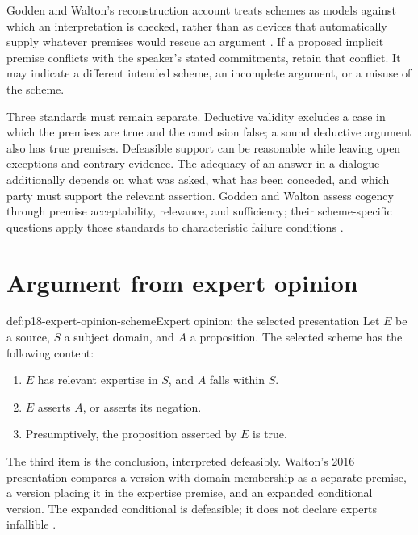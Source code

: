 Godden and Walton's reconstruction account treats schemes as models
against which an interpretation is checked, rather than as devices that
automatically supply whatever premises would rescue an argument
\cite[pp.~271--272]{GoddenWalton2007SchemesQuestions}.
If a proposed implicit premise conflicts with the speaker's stated
commitments, retain that conflict. It may indicate a different intended
scheme, an incomplete argument, or a misuse of the scheme.

Three standards must remain separate. Deductive validity excludes a case
in which the premises are true and the conclusion false; a sound
deductive argument also has true premises. Defeasible support can be
reasonable while leaving open exceptions and contrary evidence.
The adequacy of an answer in a dialogue additionally depends on what
was asked, what has been conceded, and which party must support the
relevant assertion. Godden and Walton assess cogency through premise
acceptability, relevance, and sufficiency; their scheme-specific questions
apply those standards to characteristic failure conditions
\cite[pp.~277--283]{GoddenWalton2007SchemesQuestions}.

\section{Argument from expert opinion}
\label{sec:p18-scheme-expert}

\begin{hbdefinition}{def:p18-expert-opinion-scheme}{Expert opinion: the selected presentation}
Let \(E\) be a source, \(S\) a subject domain, and \(A\) a proposition.
The selected scheme has the following content:
\begin{enumerate}
\item \(E\) has relevant expertise in \(S\), and \(A\) falls within \(S\).
\item \(E\) asserts \(A\), or asserts its negation.
\item Presumptively, the proposition asserted by \(E\) is true.
\end{enumerate}
The third item is the conclusion, interpreted defeasibly.
Walton's 2016 presentation compares a version with domain membership as
a separate premise, a version placing it in the expertise premise,
and an expanded conditional version. The expanded conditional is
defeasible; it does not declare experts infallible
\cite[Sections 4.4--4.6]{Walton2016ArgumentEvaluation}.
\end{hbdefinition}

